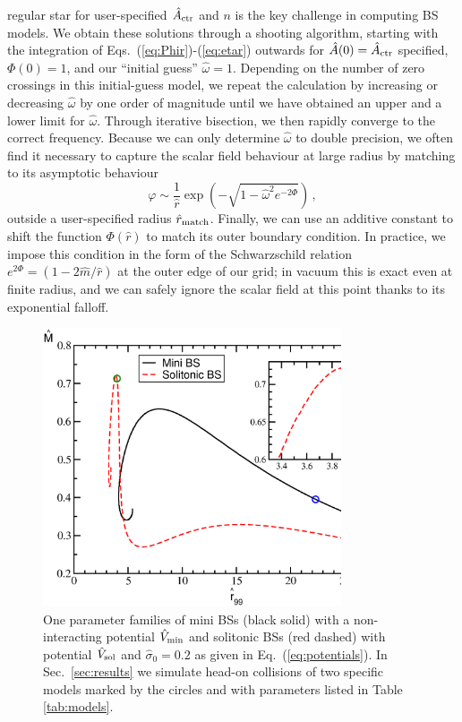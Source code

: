 \documentclass[]{iopart}
\begin{document}
regular star for user-specified $\hat{A}_{\rm ctr}$ and $n$ is
the key challenge in computing BS models. We obtain
these solutions through a shooting algorithm, starting with
the integration of
Eqs.~(\ref{eq:Phir})-(\ref{eq:etar}) outwards for
$\hat{A}(0)=\hat{A}_{\rm ctr}$ specified, $\Phi(0)=1$, and our
``initial guess'' $\hat{\omega}=1$. Depending on the number
of zero crossings in this initial-guess model, we repeat
the calculation by increasing or decreasing $\hat{\omega}$
by one order of magnitude until we have obtained an upper and
a lower limit for $\hat{\omega}$. Through iterative bisection,
we then rapidly converge to the correct frequency. Because
we can only determine $\hat{\omega}$ to double precision,
we often find it necessary to capture the scalar field
behaviour at large radius by matching to its asymptotic behaviour
%
\begin{equation}
  \varphi \sim \frac{1}{\hat{r}}
  \exp\left( {-\sqrt{1-\hat{\omega}^2e^{-2\Phi}}}\right)\,,
\end{equation}
%
outside a user-specified radius $\hat{r}_{\rm match}$. Finally,
we can use an additive constant to shift the function $\Phi(\hat{r})$
to match its outer boundary condition. In practice, we impose
this condition in the form of the Schwarzschild relation
$e^{2\Phi}=(1-2\hat{m}/\hat{r})$ at the outer edge of our
grid; in vacuum this is exact even
at finite radius, and we can safely ignore the scalar field
at this point thanks to its exponential falloff.
%
\begin{figure}[b]
    \centering
    \includegraphics[width=250pt]{statBS.eps}
    \caption{One parameter families of mini BSs (black solid) with a
    non-interacting potential $\hat{V}_{\rm min}$ and solitonic BSs (red dashed) with
    potential $\hat{V}_{\rm sol}$ and $\hat{\sigma}_0=0.2$
    as given in Eq.~(\ref{eq:potentials}). In Sec.~\ref{sec:results}
    we simulate head-on collisions of two specific models
    marked by the circles and with parameters listed in
    Table \ref{tab:models}.
    }
    \label{fig:statBS}
\end{figure}
%
\end{document}

